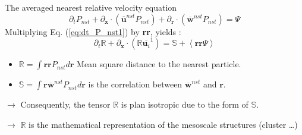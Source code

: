 \documentclass{sintefbeamer}
\newcommand{\avg}[1]{\left<#1\right>}
\newcommand{\nstavg}[1]{\overline{#1}^{nst}}
\newcommand{\condavg}[2]{\overline{#1}^{#2}}
\newcommand{\pddt}{\partial_t}
\begin{document}
\begin{frame}{The averaged nearest relative velocity equation}
  \begin{equation}
      \pddt P_{nst}
      +  \partial_{\textbf{x}} \cdot
      \left(
        \nstavg{\textbf{u}}
        P_{nst}
      \right)
    + 
       \partial_{\textbf{r}} \cdot
    \left(
        \nstavg{\textbf{w}}
        P_{nst}
    \right)
    = \Psi
    \label{eq:dt_P_nst1}
\end{equation}
Multiplying Eq. (\ref{eq:dt_P_nst1}) by \textbf{rr}, yields :
\begin{equation*}
  \pddt \mathbb{R} 
+ \partial_{\textbf{x}} \cdot (\mathbb{R} \condavg{\textbf{u}_i}{1}
)
= 
 \mathbb{S}
+ \avg{\textbf{r}\textbf{r}\Psi}
\end{equation*}

\begin{itemize}
  \item $\mathbb{R} = \int \textbf{rr} P_{nst} d\textbf{r}$ Mean square distance to the nearest particle. 
  \item $\mathbb{S} = \int \textbf{r} \nstavg{\textbf{w}}P_{nst} d\textbf{r}$ is the  correlation between $\nstavg{\textbf{w}}$ and $\textbf{r}$. 
\end{itemize}

$\rightarrow$ Consequently, the tensor $\mathbb{R}$ is plan isotropic due to the form of $\mathbb{S}$.

$\rightarrow $ $\mathbb{R}$ is the mathematical representation of the mesoscale structures (cluster \ldots)
\vfill
\begin{figure}
  \centering
    \hfill
\end{figure}


\end{frame}
\end{document}
